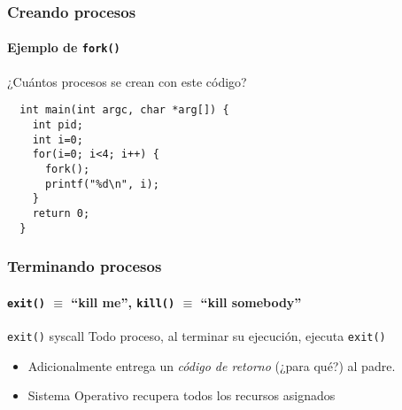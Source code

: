 \documentclass[letter]{beamer}
\begin{document}
\begin{frame}[fragile]
  \frametitle{Creando procesos}
  \framesubtitle{Ejemplo de {\tt fork()}}

¿Cuántos procesos se crean con este código?

\begin{verbatim}
  int main(int argc, char *arg[]) {
    int pid;
    int i=0;
    for(i=0; i<4; i++) {
      fork();
      printf("%d\n", i);
    }
    return 0;
  }
\end{verbatim}
\end{frame}


\begin{frame}
  \frametitle{Terminando procesos}
  \framesubtitle{{\tt exit()} $\equiv$ ``kill me'', {\tt kill()} $\equiv$ ``kill somebody''}

  \begin{block}{{\tt exit()} syscall}
  Todo proceso, al terminar su ejecución, ejecuta {\tt exit()}
  \begin{itemize}
     \item<2-> Adicionalmente entrega un {\em código de retorno} (¿para qué?) al padre.
     \item<2-> Sistema Operativo recupera todos los recursos asignados
  \end{itemize}
  \end{block}  

\end{frame}
\end{document}
